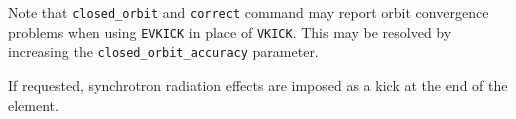 Note that \verb|closed_orbit| and \verb|correct| command may report orbit convergence problems 
when using \verb|EVKICK| in place of \verb|VKICK|. This may be resolved by increasing the
\verb|closed_orbit_accuracy| parameter.

If requested, synchrotron radiation effects are imposed as a kick at the end of the element.
